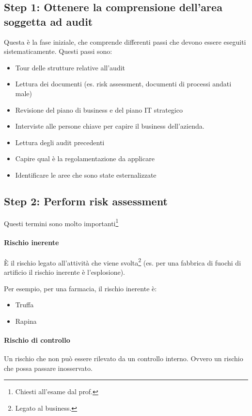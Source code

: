 \subsection{Step 1: Ottenere la comprensione dell'area soggetta ad audit}

Questa è la fase iniziale, che comprende differenti passi che devono essere 
eseguiti sistematicamente.
Questi passi sono:
\begin{itemize} 
\item Tour delle strutture relative all'audit
\item Lettura dei documenti (es. risk assessment, documenti di processi andati 
male)
\item Revisione del piano di business e del piano IT strategico
\item Interviste alle persone chiave per capire il business dell'azienda.
\item Lettura degli audit precedenti
\item Capire qual è la regolamentazione da applicare
\item Identificare le aree che sono state esternalizzate
\end{itemize}

\subsection{Step 2: Perform risk assessment} 

Questi termini sono molto importanti\footnote{Chiesti all'esame dal prof.}

\paragraph*{Rischio inerente}

È il rischio legato all'attività che viene svolta\footnote{Legato al business.} 
(es. per una fabbrica di fuochi di artificio il rischio inerente è 
l'esplosione).

Per esempio, per una farmacia, il rischio inerente è:
\begin{itemize}
\item Truffa
\item Rapina
\end{itemize}

\paragraph*{Rischio di controllo}

Un rischio che non può essere rilevato da un controllo interno. Ovvero un 
rischio che possa passare inosservato.

